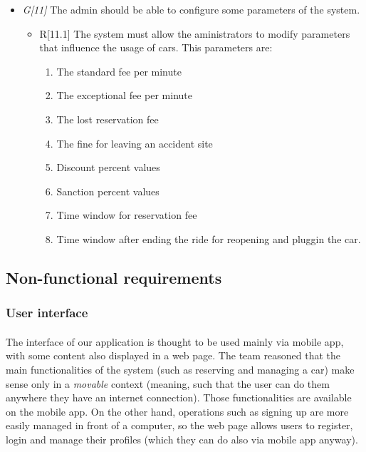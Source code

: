 \begin{itemize}
				\item \textit{G[11]} The admin should be able to configure some parameters of the system.
					\begin{itemize}
						\item R[11.1] The system must allow the aministrators to modify parameters that influence the usage of cars. This parameters are:
							\begin{enumerate}
								\item The standard fee per minute
								\item The exceptional fee per minute
								\item The lost reservation fee
								\item The fine for leaving an accident site %
								\item Discount percent values
								\item Sanction percent values
								\item Time window for reservation fee
								\item Time window after ending the ride for reopening and pluggin the car.
							\end{enumerate}
					\end{itemize}
\end{itemize}





\subsection{Non-functional requirements}
	\subsubsection{User interface}
	\paragraph{}The interface of our application is thought to be used mainly via mobile app, with some content also displayed in a web page. The team reasoned that the main functionalities of the system (such as reserving and managing a car) make sense only in a \textit{movable} context (meaning, such that the user can do them anywhere they have an internet connection). Those functionalities are available on the mobile app. On the other hand, operations such as signing up are more easily managed in front of a computer, so the web page allows users to register, login and manage their profiles (which they can do also via mobile app anyway).
